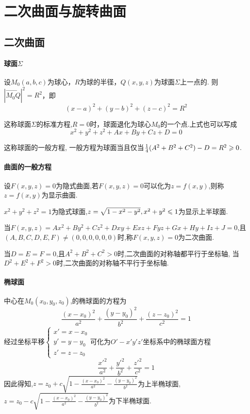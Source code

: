 \setcounter{chapter}{3}
\chapter{二次曲面与旋转曲面}

\section{二次曲面}

\subsubsection*{球面$\Sigma$}

设$M_0(a,b,c)$为球心，$R$为球的半径，$Q(x,y,z)$为球面$\Sigma$上一点的.
则$| \overrightarrow{M_0Q} |^2 = R^2$，即
$$
(x-a)^2 + (y-b)^2 + (z-c)^2 = R^2
$$

这称球面$\Sigma$的标准方程,$R =0$时，球面退化为球心$M_0$的一个点.上式也可以写成
$$
x^2 + y^2 + z^2 + Ax + By + Cz + D = 0
$$

这称球面的一般方程, 一般方程为球面当且仅当$\frac14(A^2 + B^2 + C^2)-D=R^2 \geqslant 0$.

\subsubsection*{曲面的一般方程}

设$F(x,y,z)=0$为隐式曲面,若$F(x,y,z) = 0$可以化为$z = f(x,y)$,则称$z= f(x,y)$为显示曲面.

\begin{example}
    $x^2+y^2+z^2=1$为隐式球面,$z = \sqrt{1-x^2-y^2},x^2+y^2 \leqslant 1$为显示上半球面.
\end{example}

当$F(x,y,z) = Ax^2 + By^2 + Cz^2 + Dxy + Exz + Fyz + Gx + Hy + Iz + J = 0$,且$(A,B,C,D,E,F) \neq (0,0,0,0,0,0)$时,称$F(x,y,z) = 0$为二次曲面.

当$D = E = F = 0$,且$A^2 + B^2 + C^2 >0$时,二次曲面的对称轴都平行于坐标轴,
当$D^2+E^2+F^2 > 0$时,二次曲面的对称轴不平行于坐标轴.

\subsubsection*{椭球面}

中心在$M_0(x_0,y_0,z_0)$,的椭球面的方程为
$$
\frac{(x-x_0)^2}{a^2} + \frac{(y-y_0)^2}{b^2} + \frac{(z-z_0)^2}{c^2} = 1
$$
经过坐标平移$\begin{cases}
x' = x - x_0\\
y' = y - y_0\\
z' = z - z_0
\end{cases}$可化为$O'-x'y'z'$坐标系中的椭球面方程
$$
\frac{x'^2}{a^2} + \frac{y'^2}{b^2} + \frac{z'^2}{c^2} = 1
$$
因此得知,$z = z_0 + c \sqrt{1 - \frac{(x-x_0)^2}{a^2} - \frac{(y-y_0)^2}{b^2}}$为上半椭球面,
$z = z_0 - c \sqrt{1 - \frac{(x-x_0)^2}{a^2} - \frac{(y-y_0)^2}{b^2}}$为下半椭球面.


